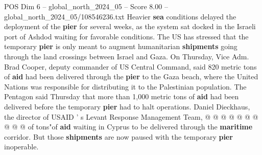 \begin{textsample}{POS Dim 6 – global\_north\_2024\_05 – Score 8.00 – global\_north\_2024\_05/108546236.txt}
Heavier \textbf{sea} conditions delayed the deployment of the \textbf{pier} for several weeks, as the system sat docked in the Israeli port of Ashdod waiting for favorable conditions.
The US has stressed that the temporary \textbf{pier} is only meant to augment humanitarian \textbf{shipments} going through the land crossings between Israel and Gaza.
On Thursday, Vice Adm.
Brad Cooper, deputy commander of US Central Command, said 820 metric tons of \textbf{aid} had been delivered through the \textbf{pier} to the Gaza beach, where the United Nations was responsible for distributing it to the Palestinian population.
The Pentagon said Thursday that more than 1,000 metric tons of \textbf{aid} had been delivered before the temporary \textbf{pier} had to halt operations.
Daniel Dieckhaus, the director of USAID ' s Levant Response Management Team, @ @ @ @ @ @ @ @ @ @ of tons"of \textbf{aid} waiting in Cyprus to be delivered through the \textbf{maritime} corridor.
But those \textbf{shipments} are now paused with the temporary \textbf{pier} inoperable.

\end{textsample}
